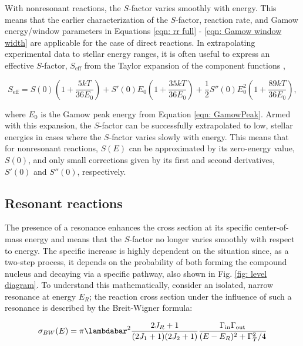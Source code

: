 With nonresonant reactions, the $S$-factor varies smoothly with energy. This means that the earlier characterization  of the $S$-factor, reaction rate, and Gamow energy/window parameters in Equations \ref{eqn: rr full} - 
\ref{eqn: Gamow window width} are applicable for the case of direct reactions. In extrapolating experimental data to stellar energy ranges, it is often useful to express an effective $S$-factor, $S_{\text{eff}}$ from the Taylor expansion of the component functions \cite{IliadisBook},

\begin{equation}
S_{\text{eff}} = S(0) \left( 1 + \dfrac{5 k T}{36 E_{0}}   \right) + S'(0) E_{0} \left( 1 + \dfrac{35 k T}{36 E_{0}}   \right)  + \dfrac{1}{2} S''(0) E_{0}^{2} \left( 1 + \dfrac{89 k T}{36 E_{0}}   \right),
\label{eqn: Seff}
\end{equation}

\noindent where $E_{0}$ is the Gamow peak energy from Equation \ref{eqn: GamowPeak}. Armed with this expansion, the $S$-factor can be successfully extrapolated to low, stellar energies in cases where the $S$-factor varies slowly with energy. This means that for nonresonant reactions, $S(E)$ can be approximated by its zero-energy value, $S(0)$, and only small corrections given by its first and second derivatives, $S'(0)$ and $S''(0)$, respectively. 




\subsection{Resonant reactions}

The presence of a resonance enhances the cross section at its specific center-of-mass energy and means that the $S$-factor no longer varies smoothly with respect to energy. The specific increase is highly dependent on the situation since, as a two-step process, it depends on the probability of both forming the compound nucleus and decaying via a specific pathway, also shown in Fig. \ref{fig: level diagram}. To understand this mathematically, consider an isolated, narrow resonance at energy $E_{R}$; the reaction cross section under the influence of such a resonance is described by the Breit-Wigner formula:

\begin{equation}
\sigma_{BW}(E) = \pi \lambdabar^{2} \frac{2J_R+1}{(2J_1+1)(2J_2+1)}\frac{\Gamma_\mathrm{in}\Gamma_\mathrm{out}}{(E-E_{R})^2+\Gamma_{T}^2/4}
\label{eqn: BreitWigner}
\end{equation}

